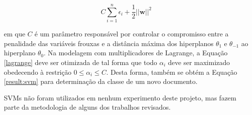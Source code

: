 \begin{equation}
\label{nonlin:svm}
\ensuremath{C\sum_{i=1}^n\epsilon_i + \frac{1}{2}||}\textbf{w}\ensuremath{||^2}
\end{equation}

em que \ensuremath{C} é um parâmetro responsável por controlar o compromisso entre a penalidade das variáveis frouxas e a distância máxima dos hiperplanos \ensuremath{\theta_1} e \ensuremath{\theta_{-1}} ao hiperplano \ensuremath{\theta_0}. Na modelagem com multiplicadores de Lagrange, a Equação \ref{lagrange} deve ser otimizada de tal forma que todo \ensuremath{\alpha_i} deve ser maximizado obedecendo à restrição \ensuremath{0 \leq \alpha_i \leq C}. Desta forma, também se obtém a Equação \ref{result:svm} para determinação da classe de um novo documento.

SVMs não foram utilizados em nenhum experimento deste projeto, mas fazem parte da metodologia de alguns dos trabalhos revisados.
 







